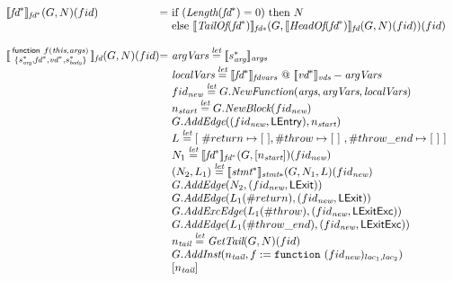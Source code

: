 \[\begin{array}{l@{}l@{~}l}
\transfun{\emph{fd}^*}_{\emph{fd}^*}(G,N)(fid) & = &
	\mbox{if}\ (\Length(\emph{fd}^*) = 0)\ \mbox{then}\ N\\
	& & \mbox{else}\ \transfun{\TailOf(\emph{fd}^*)}_{\emph{fd}*}(G, \transfun{\HeadOf(\emph{fd}^*)}_{\emph{fd}}(G,N)(fid))(fid)\\
	& & \\

\transfun{\irfundeclsmall{f}{\emph{this}}{\emph{args}}{s_{\emph{arg}}^*}{\emph{fd}^*}{\emph{vd}^*}{s_{\emph{body}}^*}}_{\emph{fd}}(G,N)(fid) & = &
	\argVars \letval \transfun{s_{\emph{arg}}^*}_{\emph{args}} \\
	& & \localVars \letval \transfun{\emph{fd}^*}_{\emph{fdvars}} ~@~ \transfun{\emph{vd}^*}_{\emph{vds}} - \argVars \\
	& & fid_{\emph{new}} \letval G.\emph{NewFunction}(\emph{args}, \argVars, \localVars)\\
	& & n_{\emph{start}} \letval G.\emph{NewBlock}(fid_{\emph{new}})\\
	& & G.\emph{AddEdge}((fid_{\emph{new}},\LEntry), n_{\emph{start}})\\
	& & L \letval [\ \#return \mapsto [\ ], \#throw \mapsto [\ ]\ , \#throw\_end \mapsto [\ ]\ ] \\
	& & N_1 \letval \transfun{\emph{fd}^*}_{\emph{fd}^*}(G,[n_{\emph{start}}])(fid_{\emph{new}})\\
	& & (N_2,L_1) \letval \transfun{\emph{stmt}^*}_{\emph{stmt}*}(G,N_1,L)(fid_{\emph{new}})\\
	& & G.\emph{AddEdge}(N_2,(fid_{\emph{new}},\LExit))\\
	& & G.\emph{AddEdge}(L_1(\#return),(fid_{\emph{new}},\LExit))\\
	& & G.\emph{AddExcEdge}(L_1(\#throw),(fid_{\emph{new}},\LExitExc))\\
	& & G.\emph{AddEdge}(L_1(\#throw\_end),(fid_{\emph{new}},\LExitExc))\\
	& & n_{\emph{tail}} \letval \GetTail(G,N)(fid)\\
	& & G.\emph{AddInst}(n_{\emph{tail}},f := \TT{function}\ (fid_{\emph{new}})_{loc_1,loc_2})\\
	& & [n_{\emph{tail}}]\\
	& & \\
\end{array}
\]

